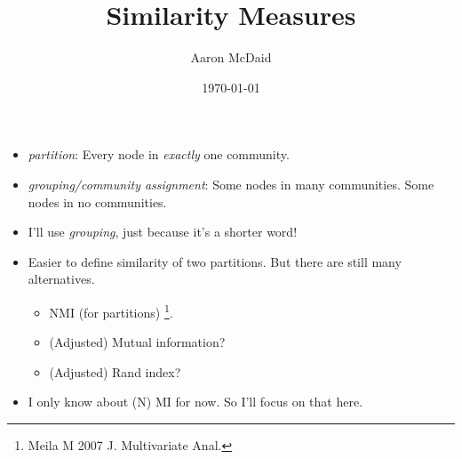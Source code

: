 \documentclass{beamer}
\title{Similarity Measures}
\author{Aaron McDaid}
\date{\today}
\begin{document}
\frame{\titlepage}


\frame
{

  \begin{itemize}
  \item \emph{partition}: Every node in \emph{exactly} one community.
  \item \emph{grouping/community assignment}: Some nodes in many communities. Some nodes in no communities.
  \item I'll use \emph{grouping}, just because it's a shorter word!
  \end{itemize}
}

\frame
{

  \begin{itemize}
  \item Easier to define similarity of two partitions. But there are still many alternatives.
  	\begin{itemize}
  	\item NMI (for partitions) \footnote{Meila M 2007 J. Multivariate Anal.}.
  	\item (Adjusted) Mutual information?
  	\item (Adjusted) Rand index?
  	\end{itemize}
	\item I only know about (N) MI for now. So I'll focus on that here.
  \end{itemize}
}
\end{document}
